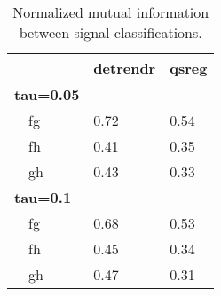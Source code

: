 \begin{table}[!tbp]
\caption{Normalized mutual information between signal classifications.\label{NMI}} 
\begin{center}
\begin{tabular}{lll}
\hline\hline
\multicolumn{1}{l}{}&\multicolumn{1}{c}{detrendr}&\multicolumn{1}{c}{qsreg}\tabularnewline
\hline
{\bfseries tau=0.05}&&\tabularnewline
~~fg&0.72&0.54\tabularnewline
~~fh&0.41&0.35\tabularnewline
~~gh&0.43&0.33\tabularnewline
\hline
{\bfseries tau=0.1}&&\tabularnewline
~~fg&0.68&0.53\tabularnewline
~~fh&0.45&0.34\tabularnewline
~~gh&0.47&0.31\tabularnewline
\hline
\end{tabular}\end{center}
\end{table}
